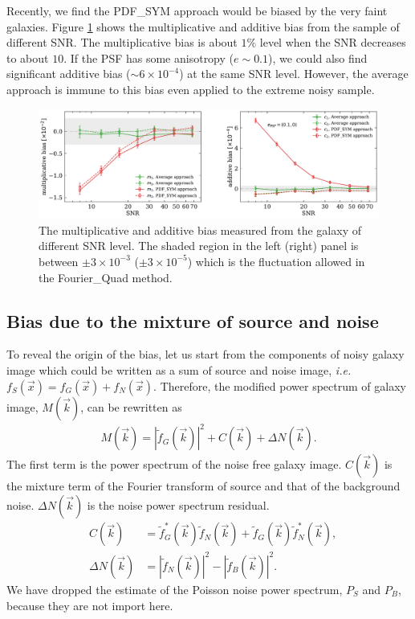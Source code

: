 \documentclass[twocolumn]{aastex62}
\def\ie{{\it i.e. }}
\begin{document}
Recently, we find the PDF\_SYM approach would be biased by the very faint galaxies. Figure \ref{fig:pts_mc} shows the multiplicative and additive bias from the sample of different SNR. The multiplicative bias is about $1\%$ level when the SNR decreases to about $10$. If the PSF has some anisotropy ($e \sim 0.1$), we could also find significant additive bias ($\sim 6\times 10^{-4}$) at the same SNR level. However, the average approach is immune to this bias even applied to the extreme noisy sample. 




\begin{figure}[htbp]
	\centering
	\includegraphics[width=0.9\linewidth]{figures/pts_sample_mc.pdf}
	\caption{The multiplicative and additive bias measured from the galaxy of different SNR level. The shaded region in the left (right) panel is between $\pm 3\times 10^{-3}$ ($\pm 3\times10^{-5}$) which is the fluctuation allowed in the Fourier\_Quad method. }\label{fig:pts_mc}
\end{figure}


\subsection{Bias due to the mixture of source and noise}
To reveal the origin of the bias, let us start from the components of noisy galaxy image which could be written as a sum of source and noise image, \ie$f_S(\vec{x}) = f_G(\vec{x}) + f_N(\vec{x})$. Therefore, the modified power spectrum of galaxy image, $M(\vec{k})$, can be rewritten as 
\begin{eqnarray}
M(\vec{k}) =  \left\vert\widetilde{f}_G(\vec{k})\right\vert^2+ C(\vec{k}) + \Delta N(\vec{k}).
\end{eqnarray}
The first term is the power spectrum of the noise free galaxy image. $C(\vec{k})$ is the mixture term of the Fourier transform of source and that of the background noise. $\Delta N(\vec{k})$ is the noise power spectrum residual. 
\begin{eqnarray}
& C(\vec{k})& = \widetilde{f}_{G}^{*}(\vec{k})\widetilde{f}_N(\vec{k}) + \widetilde{f}_{G}(\vec{k})\widetilde{f}_{N}^{*}(\vec{k}),\\ \nonumber
&\Delta N(\vec{k})& = \left\vert\widetilde{f}_N(\vec{k})\right\vert^2 -\left\vert\widetilde{f}_B(\vec{k})\right\vert^2.
\end{eqnarray}
We have dropped the estimate of the Poisson noise power spectrum, $P_S$ and $P_B$, because they are not import here. 
\end{document}
